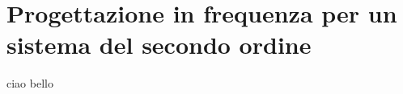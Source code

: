\section{Progettazione in frequenza per un sistema del secondo ordine}
	\label{sec:codice}
	
	
	ciao bello